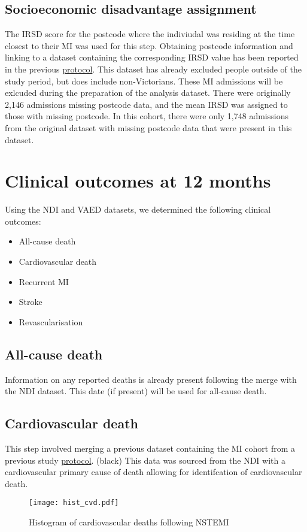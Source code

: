 \documentclass[11pt]{article}
\begin{document}
\subsection{Socioeconomic disadvantage assignment}
The IRSD score for the postcode where the indiviudal was residing at the time closest to their MI was used for this step. Obtaining postcode information and linking to a dataset containing the corresponding IRSD value has been reported in the previous \color{blue} \href{https://github.com/cardiopharmnerd/medsremote}{protocol}. \color{black} This dataset has already excluded people outside of the study period, but does include non-Victorians. These MI admissions will be exlcuded during the preparation of the analysis dataset. There were originally 2,146 admissions missing postcode data, and the mean IRSD was assigned to those with missing postcode. In this cohort, there were only 1,748 admissions from the original dataset with missing postcode data that were present in this dataset. 
\color{violet}
\begin{stlog}\end{stlog}
\color{black}
\pagebreak
\section{Clinical outcomes at 12 months}
Using the NDI and VAED datasets, we determined the following clinical outcomes:
\begin{itemize}
\item All-cause death 
\item Cardiovascular death
\item Recurrent MI
\item Stroke
\item Revascularisation
\end{itemize}
\color{violet}
\subsection{All-cause death}
Information on any reported deaths is already present following the merge with the NDI dataset. This date (if present) will be used for all-cause death.
\subsection{Cardiovascular death}
This step involved merging a previous dataset containing the MI cohort from a previous study \color{blue} \href{https://github.com/cardiopharmnerd/medsremote}{protocol}. \color(black) This data was sourced from the NDI with a cardiovascular primary cause of death allowing for identifcation of cardiovascular death. 
\begin{stlog}\end{stlog}
\color{black}
\begin{figure} [h]
	\centering
	\texttt{[image: hist\_cvd.pdf]}
	\caption{Histogram of cardiovascular deaths following NSTEMI}
	\label{hist_cvd}
\end{figure}
\pagebreak
\end{document}
